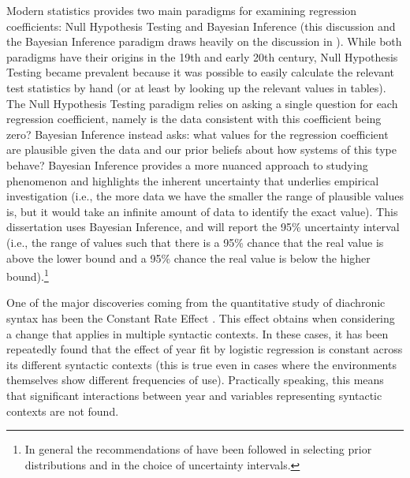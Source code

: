 	Modern statistics provides two main paradigms for examining regression coefficients: Null Hypothesis Testing and Bayesian Inference (this discussion and the Bayesian Inference paradigm draws heavily on the discussion in \citealt{Kruschke.2010}). While both paradigms have their origins in the 19th and early 20th century, Null Hypothesis Testing became prevalent because it was possible to easily calculate the relevant test statistics by hand (or at least by looking up the relevant values in tables). The Null Hypothesis Testing paradigm relies on asking a single question for each regression coefficient, namely is the data consistent with this coefficient being zero? Bayesian Inference instead asks: what values for the regression coefficient are plausible given the data and our prior beliefs about how systems of this type behave? Bayesian Inference provides a more nuanced approach to studying phenomenon and highlights the inherent uncertainty that underlies empirical investigation (i.e., the more data we have the smaller the range of plausible values is, but it would take an infinite amount of data to identify the exact value). This dissertation uses Bayesian Inference, and will report the 95\% uncertainty interval (i.e., the range of values such that there is a 95\% chance that the real value is above the lower bound and a 95\% chance the real value is below the higher bound).\footnote{In general the recommendations of \cite{Gelman.2008} have been followed in selecting prior distributions and in the choice of uncertainty intervals.}

	One of the major discoveries coming from the quantitative study of diachronic syntax has been the Constant Rate Effect \citep{Kroch.1989,Kroch.1994}. This effect obtains when considering a change that applies in multiple syntactic contexts. In these cases, it has been repeatedly found that the effect of year fit by logistic regression is constant across its different syntactic contexts (this is true even in cases where the environments themselves show different frequencies of use). Practically speaking, this means that significant interactions between year and variables representing syntactic contexts are not found.


